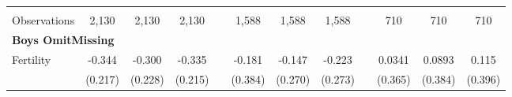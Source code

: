 \begin{landscape}
\begin{table}[htpb!]
\begin{center}
\begin{tabular}{lcccp{2mm}cccp{2mm}ccc}
\begin{footnotesize}\end{footnotesize}&\begin{footnotesize}\end{footnotesize}&\begin{footnotesize}\end{footnotesize}&\begin{footnotesize}\end{footnotesize}&\begin{footnotesize}\end{footnotesize}&\begin{footnotesize}\end{footnotesize}&\begin{footnotesize}\end{footnotesize}&\begin{footnotesize}\end{footnotesize}&\begin{footnotesize}\end{footnotesize}&\begin{footnotesize}\end{footnotesize}&\begin{footnotesize}\end{footnotesize}&\begin{footnotesize}\end{footnotesize}\\Observations&2,130&2,130&2,130&&1,588&1,588&1,588&&710&710&710\\
\multicolumn{12}{l}{\textbf{Boys OmitMissing}}\\ 
Fertility&-0.344&-0.300&-0.335&&-0.181&-0.147&-0.223&&0.0341&0.0893&0.115\\
&(0.217)&(0.228)&(0.215)&&(0.384)&(0.270)&(0.273)&&(0.365)&(0.384)&(0.396)\\

\end{tabular}
\end{center}
\end{table}
\end{landscape}
